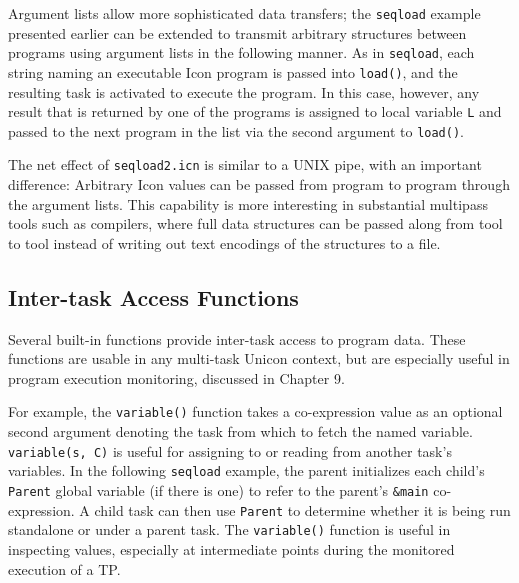 
Argument lists allow more sophisticated data transfers; the {\tt seqload}
example presented earlier can be extended to transmit arbitrary
structures between programs using argument lists in the following
manner.  As in {\tt seqload}, each string naming an executable Icon
program is passed into {\tt load()}, and the resulting task is
activated to execute the program.  In this case, however, any result
that is returned by one of the programs is assigned to local variable
{\tt L} and passed to the next program in the list via the second
argument to {\tt load()}.


The net effect of {\tt seqload2.icn} is similar to a UNIX pipe, with
an important difference: Arbitrary Icon values can be passed from
program to program through the argument lists.
This capability is more interesting in substantial multipass tools
such as compilers, where full data structures can be passed along from
tool to tool instead of writing out text encodings of the structures
to a file.


\subsection*{Inter-task Access Functions}

Several built-in functions
provide inter-task access to program data.  These functions
are usable in any multi-task Unicon context, but are especially
useful in program execution monitoring, discussed in Chapter 9.

For example, the
{\tt variable()} function takes a co-expression value as an
optional second argument denoting the task from which to fetch the named
variable. {\tt variable(s, C)} is
useful for assigning to or reading from another task's
variables. In the following {\tt seqload} example, the
parent initializes each child's {\tt Parent} global
variable (if there is one) to refer to the parent's {\tt \&main}
co-expression.  A child task can then use {\tt Parent} to determine
whether it is being run standalone or under a parent task.
The {\tt variable()} function is
useful in inspecting values, especially at intermediate points during
the monitored execution of a TP.

